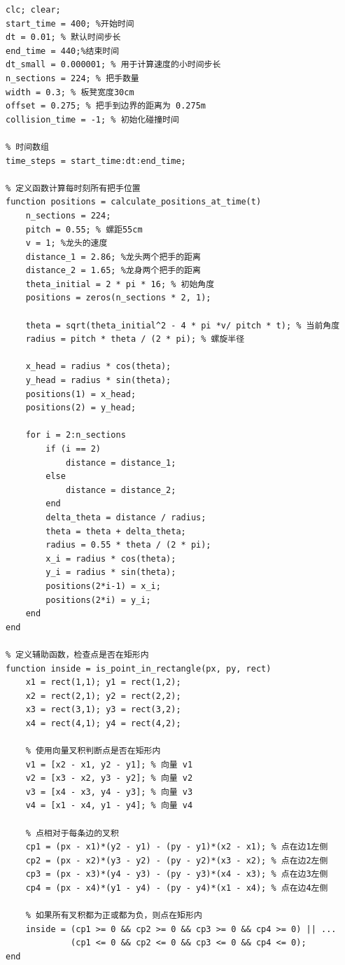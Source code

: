 \documentclass{cumcmthesis1}
\begin{document}
\begin{lstlisting}[caption={求解问题2的代码，将碰撞时间打印到控制台，并将位置，速度等信息写入到result2.xlsx中}, label={lst:second_code}]
clc; clear;
start_time = 400; %开始时间
dt = 0.01; % 默认时间步长
end_time = 440;%结束时间
dt_small = 0.000001; % 用于计算速度的小时间步长
n_sections = 224; % 把手数量
width = 0.3; % 板凳宽度30cm
offset = 0.275; % 把手到边界的距离为 0.275m
collision_time = -1; % 初始化碰撞时间

% 时间数组
time_steps = start_time:dt:end_time;

% 定义函数计算每时刻所有把手位置
function positions = calculate_positions_at_time(t)
    n_sections = 224;
    pitch = 0.55; % 螺距55cm
    v = 1; %龙头的速度
    distance_1 = 2.86; %龙头两个把手的距离
    distance_2 = 1.65; %龙身两个把手的距离
    theta_initial = 2 * pi * 16; % 初始角度
    positions = zeros(n_sections * 2, 1);
    
    theta = sqrt(theta_initial^2 - 4 * pi *v/ pitch * t); % 当前角度
    radius = pitch * theta / (2 * pi); % 螺旋半径
    
    x_head = radius * cos(theta); 
    y_head = radius * sin(theta);
    positions(1) = x_head;
    positions(2) = y_head;
    
    for i = 2:n_sections
        if (i == 2)
            distance = distance_1;
        else
            distance = distance_2;
        end
        delta_theta = distance / radius;
        theta = theta + delta_theta;
        radius = 0.55 * theta / (2 * pi);
        x_i = radius * cos(theta);
        y_i = radius * sin(theta);
        positions(2*i-1) = x_i;
        positions(2*i) = y_i;
    end
end

% 定义辅助函数，检查点是否在矩形内
function inside = is_point_in_rectangle(px, py, rect)
    x1 = rect(1,1); y1 = rect(1,2);
    x2 = rect(2,1); y2 = rect(2,2);
    x3 = rect(3,1); y3 = rect(3,2);
    x4 = rect(4,1); y4 = rect(4,2);
    
    % 使用向量叉积判断点是否在矩形内
    v1 = [x2 - x1, y2 - y1]; % 向量 v1
    v2 = [x3 - x2, y3 - y2]; % 向量 v2
    v3 = [x4 - x3, y4 - y3]; % 向量 v3
    v4 = [x1 - x4, y1 - y4]; % 向量 v4
    
    % 点相对于每条边的叉积
    cp1 = (px - x1)*(y2 - y1) - (py - y1)*(x2 - x1); % 点在边1左侧
    cp2 = (px - x2)*(y3 - y2) - (py - y2)*(x3 - x2); % 点在边2左侧
    cp3 = (px - x3)*(y4 - y3) - (py - y3)*(x4 - x3); % 点在边3左侧
    cp4 = (px - x4)*(y1 - y4) - (py - y4)*(x1 - x4); % 点在边4左侧
    
    % 如果所有叉积都为正或都为负，则点在矩形内
    inside = (cp1 >= 0 && cp2 >= 0 && cp3 >= 0 && cp4 >= 0) || ...
             (cp1 <= 0 && cp2 <= 0 && cp3 <= 0 && cp4 <= 0);
end


\end{lstlisting}
\end{document}
